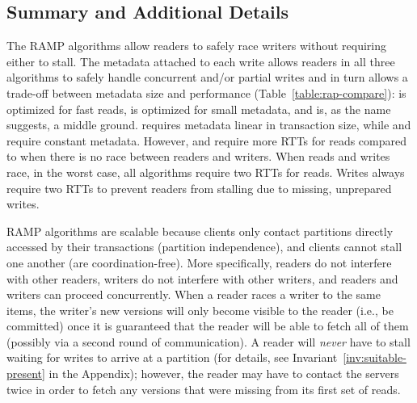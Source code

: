 \subsection{Summary and Additional Details}

The RAMP algorithms allow readers to safely race writers without
requiring either to stall. The metadata attached to each write allows
readers in all three algorithms to safely handle concurrent and/or
partial writes and in turn allows a trade-off between metadata size
and performance (Table~\ref{table:rap-compare}): \rapl is optimized
for fast reads, \raps is optimized for small metadata, and \rapb is,
as the name suggests, a middle ground. \rapl requires metadata linear
in transaction size, while \raps and \rapb require constant
metadata. However, \raps and \rapb require more RTTs for reads
compared to \rapl when there is no race between readers and
writers. When reads and writes race, in the worst case, all algorithms
require two RTTs for reads.  Writes always require two RTTs to prevent
readers from stalling due to missing, unprepared writes.

RAMP algorithms are scalable because clients only contact partitions
directly accessed by their transactions (partition independence), and clients
cannot stall one another (are coordination-free). More
specifically, readers do not interfere with other readers, writers do
not interfere with other writers, and readers and writers can proceed
concurrently. When a reader races a writer to the same items, the
writer's new versions will only become visible to the reader (i.e., be
committed) once it is guaranteed that the reader will be able to fetch
all of them (possibly via a second round of communication). A reader
will \textit{never} have to stall waiting for writes to arrive at a
partition (for details, see Invariant~\ref{inv:suitable-present} in
the Appendix); however, the reader may have to contact the servers
twice in order to fetch any versions that were missing from its first
set of reads.


